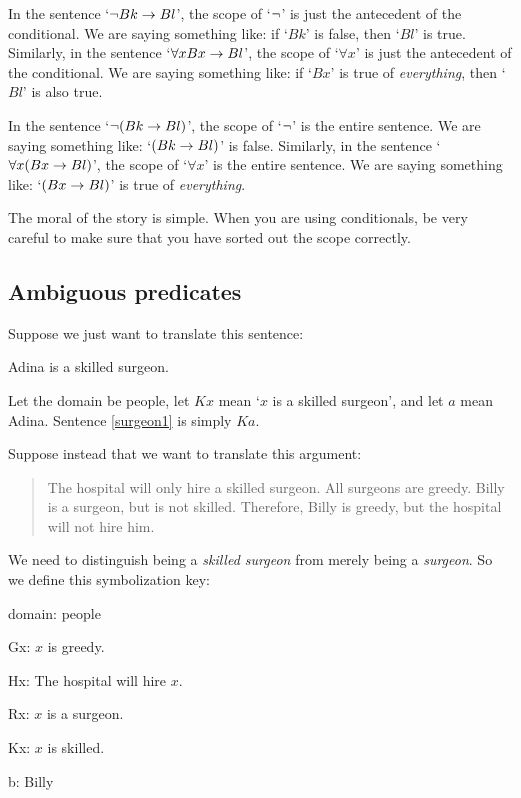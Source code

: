 In the sentence `$\neg Bk \rightarrow Bl$', the scope of `$\neg$' is just the antecedent of the conditional. We are saying something like: if `$Bk$' is false, then `$Bl$' is true. Similarly, in the sentence `$\forall x Bx \rightarrow Bl$', the scope of `$\forall x$' is just the antecedent of the conditional. We are saying something like: if `$Bx$' is true of \emph{everything}, then `$Bl$' is also true. 

In the sentence `$\neg(Bk \rightarrow Bl)$', the scope of `$\neg$' is the entire sentence. We are saying something like: `$(Bk \rightarrow Bl)$' is false. Similarly, in the sentence `$\forall x (Bx \rightarrow Bl)$', the scope of `$\forall x$' is the entire sentence. We are saying something like: `$(Bx \rightarrow Bl)$' is true of \emph{everything}.

The moral of the story is simple. When you are using conditionals, be very careful to make sure that you have sorted out the scope correctly. 

\subsection{Ambiguous predicates}

Suppose we just want to translate this sentence:
\begin{earg}
\item[\ex{surgeon1}] Adina is a skilled surgeon.
\end{earg}
Let the domain be people, let $Kx$ mean `$x$ is a skilled surgeon', and let $a$ mean Adina. Sentence \ref{surgeon1} is simply $Ka$.


Suppose instead that we want to translate this argument:
\begin{quote}
The hospital will only hire a skilled surgeon. All surgeons are greedy. Billy is a surgeon, but is not skilled. Therefore, Billy is greedy, but the hospital will not hire him.
\end{quote}
We need to distinguish being a \emph{skilled surgeon} from merely being a \emph{surgeon}. So we define this symbolization key:
\begin{ekey}
\item[domain:] people
\item[Gx:] $x$ is greedy.
\item[Hx:] The hospital will hire $x$.
\item[Rx:] $x$ is a surgeon.
\item[Kx:] $x$ is skilled.
\item[b:] Billy
\end{ekey}


